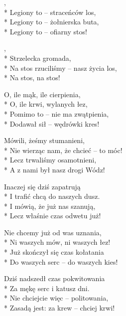 \begin{lyrics}[longestline={Na stos rzuciliśmy -- nasz życia los,}]

,\\*
Legiony to -- straceńców los,\\*
Legiony to -- żołnierska buta,\\*
Legiony to -- ofiarny stos!

\begin{chorus}
,\\*
Strzelecka gromada,\\*
Na stos rzuciliśmy -- nasz życia los,\\*
Na stos, na stos!
\end{chorus}

O, ile mąk, ile cierpienia,\\*
O, ile krwi, wylanych łez,\\*
Pomimo to -- nie ma zwątpienia,\\*
Dodawał sił -- wędrówki kres!

\chorusref

Mówili, żeśmy stumanieni,\\*
Nie wierząc nam, że chcieć -- to móc!\\*
Lecz trwaliśmy osamotnieni,\\*
A z nami był nasz drogi Wódz!

\chorusref

Inaczej się dziś zapatrują\\*
I trafić chcą do naszych dusz.\\*
I mówią, że już nas szanują,\\*
Lecz właśnie czas odwetu już!

\chorusref

\breaklyrics

Nie chcemy już od was uznania,\\*
Ni waszych mów, ni waszych łez!\\*
Już skończył się czas kołatania\\*
Do waszych serc -- do waszych kies!

\chorusref

Dziś nadszedł czas pokwitowania\\*
Za mękę serc i katusz dni.\\*
Nie chciejcie więc -- politowania,\\*
Zasadą jest: za krew -- chciej krwi!

\chorusref


\end{lyrics}
